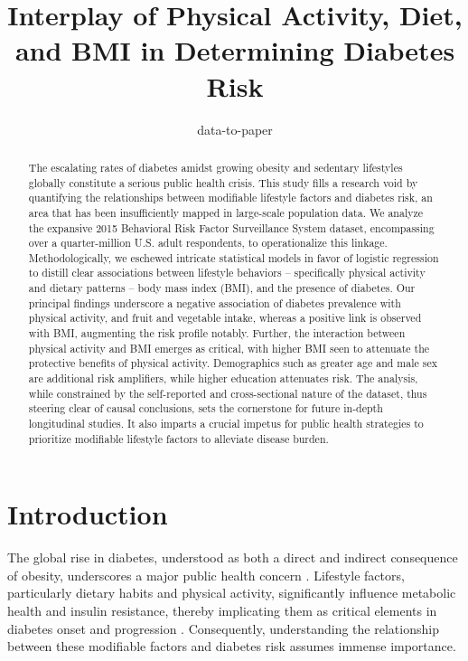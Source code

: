 \documentclass[11pt]{article}
\title{Interplay of Physical Activity, Diet, and BMI in Determining Diabetes Risk}
\author{data-to-paper}
\begin{document}
\maketitle
\begin{abstract}
The escalating rates of diabetes amidst growing obesity and sedentary lifestyles globally constitute a serious public health crisis. This study fills a research void by quantifying the relationships between modifiable lifestyle factors and diabetes risk, an area that has been insufficiently mapped in large-scale population data. We analyze the expansive 2015 Behavioral Risk Factor Surveillance System dataset, encompassing over a quarter-million U.S. adult respondents, to operationalize this linkage. Methodologically, we eschewed intricate statistical models in favor of logistic regression to distill clear associations between lifestyle behaviors – specifically physical activity and dietary patterns – body mass index (BMI), and the presence of diabetes. Our principal findings underscore a negative association of diabetes prevalence with physical activity, and fruit and vegetable intake, whereas a positive link is observed with BMI, augmenting the risk profile notably. Further, the interaction between physical activity and BMI emerges as critical, with higher BMI seen to attenuate the protective benefits of physical activity. Demographics such as greater age and male sex are additional risk amplifiers, while higher education attenuates risk. The analysis, while constrained by the self-reported and cross-sectional nature of the dataset, thus steering clear of causal conclusions, sets the cornerstone for future in-depth longitudinal studies. It also imparts a crucial impetus for public health strategies to prioritize modifiable lifestyle factors to alleviate disease burden.
\end{abstract}
\section*{Introduction}

The global rise in diabetes, understood as both a direct and indirect consequence of obesity, underscores a major public health concern \cite{Chan1994ObesityFD, McAllister2009TenPC}. Lifestyle factors, particularly dietary habits and physical activity, significantly influence metabolic health and insulin resistance, thereby implicating them as critical elements in diabetes onset and progression \cite{Li2017TimeTO, Wing2011BenefitsOM, Powell-Wiley2021ObesityAC, Bellou2018RiskFF}. Consequently, understanding the relationship between these modifiable factors and diabetes risk assumes immense importance. 
\end{document}

